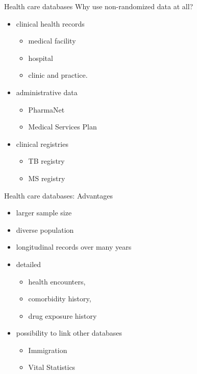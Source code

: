 \documentclass[
  ignorenonframetext,
  aspectratio=169]{beamer}
\providecommand{\tightlist}{%
  \setlength{\itemsep}{0pt}\setlength{\parskip}{0pt}}
\begin{document}
\begin{frame}{Health care databases}
\protect\hypertarget{health-care-databases}{}
Why use non-randomized data at all?

\begin{itemize}
\tightlist
\item
  clinical health records

  \begin{itemize}
  \tightlist
  \item
    medical facility
  \item
    hospital
  \item
    clinic and practice.
  \end{itemize}
\item
  administrative data

  \begin{itemize}
  \tightlist
  \item
    PharmaNet
  \item
    Medical Services Plan
  \end{itemize}
\item
  clinical registries

  \begin{itemize}
  \tightlist
  \item
    TB registry
  \item
    MS registry
  \end{itemize}
\end{itemize}
\end{frame}

\begin{frame}{Health care databases: Advantages}
\protect\hypertarget{health-care-databases-advantages}{}
\begin{itemize}
\tightlist
\item
  larger sample size
\item
  diverse population
\item
  longitudinal records over many years
\item
  detailed

  \begin{itemize}
  \tightlist
  \item
    health encounters,
  \item
    comorbidity history,
  \item
    drug exposure history
  \end{itemize}
\item
  possibility to link other databases

  \begin{itemize}
  \tightlist
  \item
    Immigration
  \item
    Vital Statistics
  \end{itemize}
\end{itemize}
\end{frame}
\end{document}
